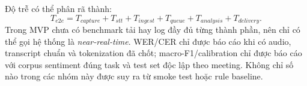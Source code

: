 Độ trễ có thể phân rã thành:
\begin{equation}
  T_{e2e}=T_{capture}+T_{stt}+T_{ingest}+T_{queue}+T_{analysis}+T_{delivery}.
\end{equation}
Trong MVP chưa có benchmark tải hay log đầy đủ từng thành phần, nên chỉ có thể gọi hệ thống là \emph{near-real-time}. WER/CER chỉ được báo cáo khi có audio, transcript chuẩn và tokenization đã chốt; macro-F1/calibration chỉ được báo cáo với corpus sentiment đúng task và test set độc lập theo meeting. Không chỉ số nào trong các nhóm này được suy ra từ smoke test hoặc rule baseline.
